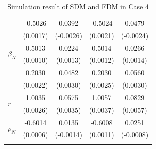 \documentclass[11pt]{article}
\begin{document}
{\begin{table}[h!]
{\begin{minipage}{0.5\textwidth}
\begin{tabular}{lcccc}
        \midrule
        \multirow{6}{*}{$\beta_N$} & -0.5026 & 0.0392 & -0.5024 & 0.0479 \\
         & (0.0017) & (-0.0026) & (0.0021) & (-0.0024) \\
        \cmidrule{2-5}
         & 0.5013 & 0.0224 & 0.5014 & 0.0266 \\
         & (0.0010) & (0.0013) & (0.0012) & (0.0014) \\
        \cmidrule{2-5}
         & 0.2030 & 0.0482 & 0.2030 & 0.0560 \\
         & (0.0022) & (0.0030) & (0.0025) & (0.0030) \\
        \midrule
        \multirow{2}{*}{$r$} & 1.0035 & 0.0575 & 1.0057 & 0.0829 \\
         & (0.0026) & (0.0035) & (0.0037) & (0.0057) \\
        \midrule
        \multirow{2}{*}{$\rho_N$} & -0.6014 & 0.0135 & -0.6008 & 0.0251 \\
         & (0.0006) & (-0.0014) & (0.0011) & (-0.0008) \\
        \hhline{=====}
        \end{tabular}
    \end{minipage}
}
\caption{Simulation result of SDM and FDM in Case 4}\label{tab:AppSimEndCase4}
\end{table}

}
\end{document}
